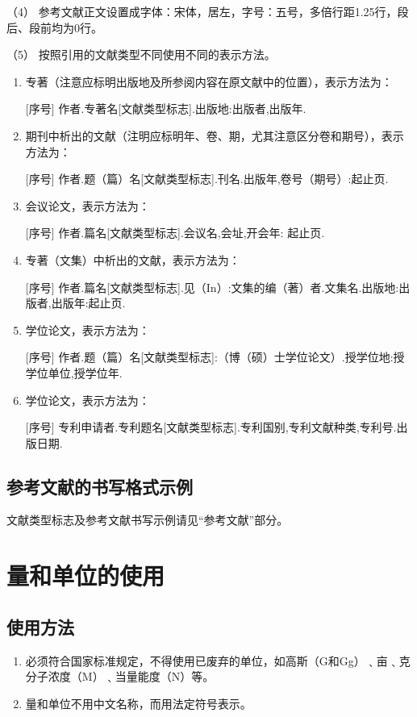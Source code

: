 （4） 参考文献正文设置成字体：宋体，居左，字号：五号，多倍行距1.25行，段后、段前均为0行。

（5） 按照引用的文献类型不同使用不同的表示方法。
\begin{enumerate}[label=\circled{\arabic*}]
\item 专著（注意应标明出版地及所参阅内容在原文献中的位置），表示方法为：

[序号] 作者.专著名[文献类型标志].出版地:出版者,出版年.
\item 期刊中析出的文献（注明应标明年、卷、期，尤其注意区分卷和期号），表示方法为：

[序号] 作者.题（篇）名[文献类型标志].刊名.出版年,卷号（期号）:起止页.
\item 会议论文，表示方法为：

[序号] 作者.篇名[文献类型标志].会议名,会址,开会年: 起止页.
\item 专著（文集）中析出的文献，表示方法为：

[序号] 作者.篇名[文献类型标志].见（In）:文集的编（著）者.文集名.出版地:出版者,出版年:起止页.
\item 学位论文，表示方法为：

[序号] 作者.题（篇）名[文献类型标志]:（博（硕）士学位论文）.授学位地:授学位单位,授学位年.
\item 学位论文，表示方法为：

[序号] 专利申请者.专利题名[文献类型标志].专利国别,专利文献种类,专利号.出版日期.
\end{enumerate}

\subsection{参考文献的书写格式示例}
文献类型标志及参考文献书写示例请见“参考文献”部分。

\section{量和单位的使用}
\subsection{使用方法}
\begin{enumerate}
\item 必须符合国家标准规定，不得使用已废弃的单位，如高斯（G和Gg）﹑亩﹑克分子浓度（M）﹑当量能度（N）等。
\item 量和单位不用中文名称，而用法定符号表示。
\end{enumerate}

